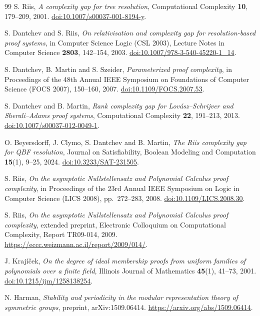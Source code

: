 \documentclass[11pt,a4paper]{article}
\theoremstyle{definition}\newtheorem{definition}[theorem]{Definition}
\theoremstyle{remark}\newtheorem{remark}[theorem]{Remark}
\begin{document}
\clearpage
\begin{thebibliography}{99}
S. Riis, \emph{A complexity gap for tree resolution},
Computational Complexity \textbf{10}, 179--209, 2001.
\href{https://doi.org/10.1007/s00037-001-8194-y}{doi:10.1007/s00037-001-8194-y}.

S. Dantchev and S. Riis, \emph{On relativisation and complexity gap for
resolution-based proof systems}, in Computer Science Logic (CSL 2003),
Lecture Notes in Computer Science \textbf{2803}, 142--154, 2003.
\href{https://doi.org/10.1007/978-3-540-45220-1_14}{doi:10.1007/978-3-540-45220-1\_14}.

S. Dantchev, B. Martin and S. Szeider, \emph{Parameterized proof complexity},
in Proceedings of the 48th Annual IEEE Symposium on Foundations of Computer Science
(FOCS 2007), 150--160, 2007.
\href{https://doi.org/10.1109/FOCS.2007.53}{doi:10.1109/FOCS.2007.53}.

S. Dantchev and B. Martin, \emph{Rank complexity gap for Lov\'asz--Schrijver
and Sherali--Adams proof systems}, Computational Complexity \textbf{22},
191--213, 2013.
\href{https://doi.org/10.1007/s00037-012-0049-1}{doi:10.1007/s00037-012-0049-1}.

O. Beyersdorff, J. Clymo, S. Dantchev and B. Martin, \emph{The Riis complexity
gap for QBF resolution}, Journal on Satisfiability, Boolean Modeling and
Computation \textbf{15}(1), 9--25, 2024.
\href{https://doi.org/10.3233/SAT-231505}{doi:10.3233/SAT-231505}.

S. Riis, \emph{On the asymptotic Nullstellensatz and Polynomial Calculus proof complexity}, in
Proceedings of the 23rd Annual IEEE Symposium on Logic in Computer Science
(LICS 2008), pp.~272--283, 2008.
\href{https://doi.org/10.1109/LICS.2008.30}{doi:10.1109/LICS.2008.30}.

S. Riis, \emph{On the asymptotic Nullstellensatz and Polynomial Calculus proof complexity}, extended preprint,
Electronic Colloquium on Computational Complexity, Report TR09-014, 2009.
\url{https://eccc.weizmann.ac.il/report/2009/014/}.

J. Kraj\'i\v cek, \emph{On the degree of ideal membership proofs from uniform
families of polynomials over a finite field}, Illinois Journal of
Mathematics \textbf{45}(1), 41--73, 2001.
\href{https://doi.org/10.1215/ijm/1258138254}{doi:10.1215/ijm/1258138254}.

N. Harman, \emph{Stability and periodicity in the modular representation
theory of symmetric groups}, preprint, arXiv:1509.06414.
\url{https://arxiv.org/abs/1509.06414}.


\end{thebibliography}
\end{document}
